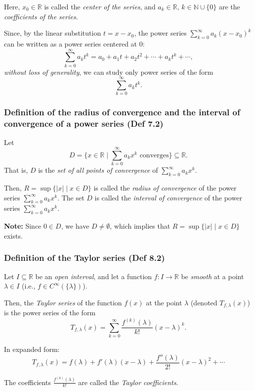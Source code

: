 Here, $x_0 \in \mathbb{R}$ is called the \textit{center of the series}, and $a_k \in \mathbb{R}, \, k \in \mathbb{N} \cup \{0\}$ are the \textit{coefficients of the series}.

Since, by the linear substitution $t = x - x_0$, the power series $\sum_{k=0}^\infty a_k (x - x_0)^k$ can be written as a power series centered at $0$:
\[
    \sum_{k=0}^\infty a_k t^k = a_0 + a_1 t + a_2 t^2 + \cdots + a_k t^k + \cdots,
\]
\textit{without loss of generality}, we can study only power series of the form
\[
    \sum_{k=0}^\infty a_k t^k.
\]

\subsubsection{Definition of the radius of convergence and the interval of convergence of a power series (Def 7.2)}

Let
\[
    D = \{x \in \mathbb{R} \mid \sum_{k=0}^\infty a_k x^k \text{ converges} \} \subseteq \mathbb{R}.
\]
That is, $D$ is the \textit{set of all points of convergence} of $\sum_{k=0}^\infty a_k x^k$.

Then, $R = \sup \{|x| \mid x \in D\}$ is called the \textit{radius of convergence} of the power series $\sum_{k=0}^\infty a_k x^k$. The set $D$ is called the \textit{interval of convergence} of the power series $\sum_{k=0}^\infty a_k x^k$.

\textbf{Note:} Since $0 \in D$, we have $D \neq \emptyset$, which implies that $R = \sup \{|x| \mid x \in D\}$ exists.

\subsubsection{Definition of the Taylor series (Def 8.2)}

Let $I \subseteq \mathbb{R}$ be an \textit{open interval}, and let a function $f: I \to \mathbb{R}$ be \textit{smooth} at a point $\lambda \in I$ (i.e., $f \in C^\infty(\{\lambda\})$).

Then, the \textit{Taylor series} of the function $f(x)$ at the point $\lambda$ (denoted $T_{f, \lambda}(x)$) is the power series of the form
\[
    T_{f, \lambda}(x) = \sum_{k=0}^\infty \frac{f^{(k)}(\lambda)}{k!} (x - \lambda)^k.
\]

In expanded form:
\[
    T_{f, \lambda}(x) = f(\lambda) + f'(\lambda)(x - \lambda) + \frac{f''(\lambda)}{2!}(x - \lambda)^2 + \cdots
\]

The coefficients $\frac{f^{(k)}(\lambda)}{k!}$ are called the \textit{Taylor coefficients}.

